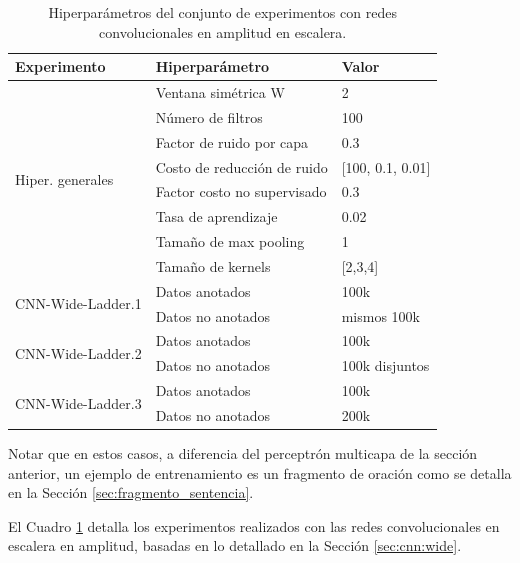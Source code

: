 \begin{table}[b!]
    \centering
    \begin{tabular}{|l|l|l|}
        \hline
        \textbf{Experimento} & \textbf{Hiperparámetro} & \textbf{Valor} \\
        \hline
        \multirow{8}{*}{Hiper. generales} & Ventana simétrica W & 2 \\
                              & Número de filtros & 100 \\
                              & Factor de ruido por capa & 0.3 \\
                              & Costo de reducción de ruido & [100, 0.1, 0.01] \\
                              & Factor costo no supervisado & 0.3 \\
                              & Tasa de aprendizaje & 0.02 \\
                              & Tamaño de max pooling & 1 \\
                              & Tamaño de kernels & [2,3,4] \\
                              
        \hline
        \multirow{2}{*}{CNN-Wide-Ladder.1} & Datos anotados & 100k \\
                                           & Datos no anotados & mismos 100k \\
        \hline
        \multirow{2}{*}{CNN-Wide-Ladder.2} & Datos anotados & 100k \\
                                           & Datos no anotados & 100k disjuntos \\
        \hline
        \multirow{2}{*}{CNN-Wide-Ladder.3} & Datos anotados & 100k \\
                                           & Datos no anotados & 200k \\
        \hline
    \end{tabular}
    \caption{Hiperparámetros del conjunto de experimentos con redes convolucionales en amplitud en escalera.}
    \label{tab:exp:cnn_wide_ladder}
\end{table}

Notar que en estos casos, a diferencia del perceptrón multicapa de la sección anterior, un ejemplo de 
entrenamiento es un fragmento de oración como se detalla en la Sección \ref{sec:fragmento_sentencia}. 

El Cuadro \ref{tab:exp:cnn_wide_ladder} detalla los experimentos realizados con las redes convolucionales
en escalera en amplitud, basadas en lo detallado en la Sección \ref{sec:cnn:wide}.

